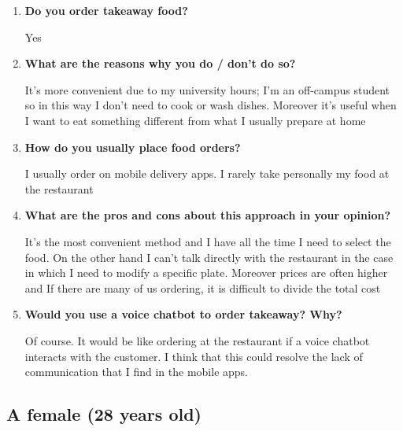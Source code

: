\begin{enumerate}

\item \textbf{Do you order takeaway food?}

Yes

\item \textbf{What are the reasons why you do / don't do so?}

It's more convenient due to my university hours; I'm an off-campus student so in this way I don't need to cook or wash dishes. Moreover it's useful when I want to eat something different from what I usually prepare at home

\item \textbf{How do you usually place food orders?}

I usually order on mobile delivery apps. I rarely take personally my food at the restaurant

\item \textbf{What are the pros and cons about this approach in your opinion?}

It's the most convenient method and I have all the time I need to select the food. On the other hand I can't talk directly with the restaurant in the case in which I need to modify a specific plate. Moreover prices are often higher and If there are many of us ordering, it is difficult to divide the total cost

\item \textbf{Would you use a voice chatbot to order takeaway? Why?}

Of course. It would be like ordering at the restaurant if a voice chatbot interacts with the customer. I think that this could resolve the lack of communication that I find in the mobile apps.

\end{enumerate}


\subsection*{A female (28 years old)}

